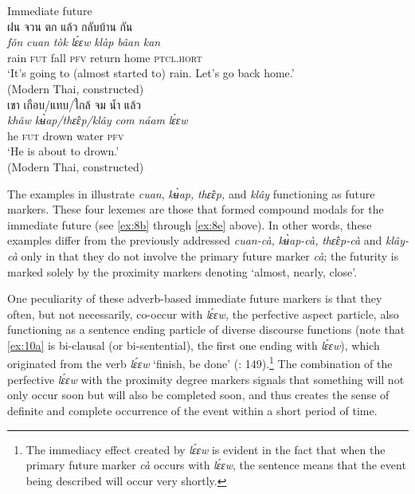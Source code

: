 \documentclass[output=paper,colorlinks,citecolor=brown]{langscibook}
\begin{document}
\ea \label{ex:10}
    \ea \label{ex:10a} Immediate future\\
    \textthai{ฝน จวน ตก แล้ว กลับบ้าน กัน}\\
    \gll \textit{fǒn} \textit{cuan} \textit{tòk} \textit{lɛ́ɛw} \textit{klàp} \textit{bâan} \textit{kan}\\
    rain \textsc{fut} fall \textsc{pfv} return home \textsc{ptcl.hort}\\
    \glt ‘It’s going to (almost started to) rain. Let’s go back home.’ \\
    \hfill (Modern Thai, constructed)\\

    \ex \label{ex:10b}
    \textthai{เขา เกือบ}/\textthai{แทบ}/\textthai{ใกล้} \textthai{จม น้ำ แล้ว}\\
    \gll \textit{khǎw} \textit{kʉ̀ap/thɛ̂ɛp/klây} \textit{com} \textit{náam} \textit{lɛ́ɛw}\\
    he \textsc{fut} drown water \textsc{pfv}\\
    \glt ‘He is about to drown.’ \\
    \hfill (Modern Thai, constructed)
    \z
\z


The examples in  illustrate \textit{cuan}, \textit{kʉ̀ap}\textit{,} \textit{thɛ̂ɛp}\textit{,} and \textit{klây} functioning as future markers. These four lexemes are those that formed compound modals for the immediate future (see \ref{ex:8b} through \ref{ex:8e} above). In other words, these examples differ from the previously addressed \textit{cuan-cà}\textit{,} \textit{kʉ̀ap-cà}\textit{, }\textit{thɛ̂ɛp-cà} and \textit{klây-cà} only in that they do not involve the primary future marker \textit{cà}; the futurity is marked solely by the proximity markers denoting ‘almost, nearly, close’. 

One peculiarity of these adverb-based immediate future markers is that they often, but not necessarily, co-occur with \textit{lɛ́ɛw}\textit{,} the perfective aspect particle, also functioning as a sentence ending particle of diverse discourse functions (note that \ref{ex:10a} is bi-clausal (or bi-sentential), the first one ending with \textit{lɛ́ɛw}), which originated from the verb \textit{lɛ́ɛw} ‘finish, be done’ (\cite{IwasakiIngkaphirom2005}: 149).\footnote{The immediacy effect created by \textit{lɛ́ɛw} is evident in the fact that when the primary future marker \textit{cà} occurs with \textit{lɛ́ɛw}, the sentence means that the event being described will occur very shortly.} The combination of the perfective \textit{lɛ́ɛw} with the proximity degree markers signals that something will not only occur soon but will also be completed soon, and thus creates the sense of definite and complete occurrence of the event within a short period of time. 
\end{document}
